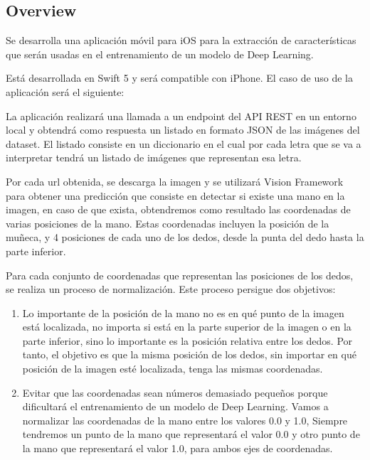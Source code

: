 \documentclass[../main.tex]{subfiles}
\begin{document}
    \subsection{Overview}
    Se desarrolla una aplicación móvil para iOS para la extracción de características que serán usadas en el entrenamiento de un modelo de Deep Learning.
    
    Está desarrollada en Swift 5 y será compatible con iPhone. El caso de uso de la aplicación será el siguiente:
    
    La aplicación realizará una llamada a un endpoint del API REST en un entorno local y obtendrá como respuesta un listado en formato JSON de las imágenes del dataset. El listado consiste en un diccionario en el cual por cada letra que se va a interpretar tendrá un listado de imágenes que representan esa letra.
    
    
    Por cada url obtenida, se descarga la imagen y se utilizará Vision Framework para obtener una predicción que consiste en detectar si existe una mano en la imagen, en caso de que exista, obtendremos como resultado las coordenadas de varias posiciones de la mano. Estas coordenadas incluyen la posición de la muñeca, y 4 posiciones de cada uno de los dedos, desde la punta del dedo hasta la parte inferior.
    
    Para cada conjunto de coordenadas que representan las posiciones de los dedos, se realiza un proceso de normalización. Este proceso persigue dos objetivos:
    
    \begin{enumerate}
        \item Lo importante de la posición de la mano no es en qué punto de la imagen está localizada, no importa si está en la parte superior de la imagen o en la parte inferior, sino lo importante es la posición relativa entre los dedos. Por tanto, el objetivo es que la misma posición de los dedos, sin importar en qué posición de la imagen esté localizada, tenga las mismas coordenadas.
        \item Evitar que las coordenadas  sean números demasiado pequeños porque dificultará el entrenamiento de un modelo de Deep Learning. Vamos a normalizar las coordenadas de la mano entre los valores 0.0 y 1.0, Siempre tendremos un punto de la mano que representará el valor 0.0 y otro punto de la mano que representará el valor 1.0, para ambos ejes de coordenadas.

    \end{enumerate}
    
\end{document}
